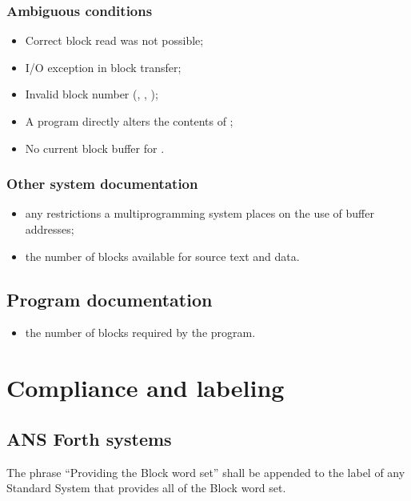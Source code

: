 \subsubsection{Ambiguous conditions} %

\begin{itemize}
\item Correct block read was not possible;
\item I/O exception in block transfer;
\item Invalid block number (,
	, );
\item A program directly alters the contents of
	;
\item No current block buffer for .
\end{itemize}

\subsubsection{Other system documentation} %

\begin{itemize}
\item any restrictions a multiprogramming system places on the use
	of buffer addresses;
\item the number of blocks available for source text and data.
\end{itemize}

\subsection{Program documentation} %

\begin{itemize}
\item the number of blocks required by the program.
\end{itemize}


\section{Compliance and labeling} %

\subsection{ANS Forth systems} %

The phrase ``Providing the Block word set'' shall be appended to
the label of any Standard System that provides all of the Block
word set.


